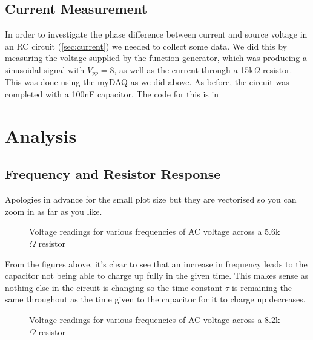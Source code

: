 \documentclass[12pt]{article}
\numberwithin{equation}{section}
\numberwithin{figure}{section}
\begin{document}
    \subsection{Current Measurement}
    In order to investigate the phase difference between current and source voltage in an RC circuit 
    (\autoref{sec:current}) we needed to collect some data. We did this by measuring the voltage supplied 
    by the function generator, which was producing a sinusoidal signal with $V_{pp}=8$, as well as the 
    current through a 15k$\Omega$ resistor. This was done using the myDAQ as we did above. As before, the 
    circuit was completed with a 100nF capacitor. The code for this is in 

    \section{Analysis}
    \subsection{Frequency and Resistor Response}\label{sec:FreqResistorResponse}
    Apologies in advance for the small plot size but they are vectorised so you can zoom in as far as you like. 
    \begin{figure}[H]%
        \centering
        \qquad
        \qquad
        \qquad
        \caption{Voltage readings for various frequencies of AC voltage across a 5.6k$\Omega$ resistor}
        \label{fig:5.6kResistor}
    \end{figure}
    
    From the figures above, it's clear to see that an increase in frequency leads to the capacitor not being 
    able to charge up fully in the given time. This makes sense as nothing else in the circuit is changing 
    so the time constant $\tau$ is remaining the same throughout as the time given to the capacitor for it 
    to charge up decreases.
    
    \begin{figure}[H]%
        \centering
        \qquad
        \qquad
        \qquad
        \caption{Voltage readings for various frequencies of AC voltage across a 8.2k$\Omega$ resistor}
        \label{fig:8.2kResistor}
    \end{figure}
\end{document}
